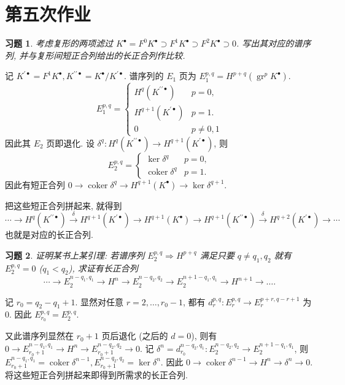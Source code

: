 \documentclass{article}
\theoremstyle{exercise}
\newtheorem{exercise}{习题}[section]
\theoremstyle{plain}
\theoremstyle{remark}
\newenvironment{proofc}{\proof}{\endproof}
\def\coker{\operatorname{coker}}
\begin{document}
\section{第五次作业}

\begin{exercise}
  考虑复形的两项滤过 $K^\bullet = F^0 K^\bullet \supset F^1 K^\bullet \supset F^2 K^\bullet \supset 0$.
  写出其对应的谱序列, 并与复形间短正合列给出的长正合列作比较.
\end{exercise}

\begin{proofc}
  记 $K^{\prime\bullet} = F^1 K^\bullet, K^{\prime\prime\bullet} = K^\bullet / K^{\prime\bullet}$.
  谱序列的 $E_1$ 页为 $E_1^{p, q} = H^{p + q}(\operatorname{gr}^p K^\bullet)$.
  \[
    E_1^{p, q} = \begin{cases}
      H^q(K^{\prime\prime\bullet}) & p = 0, \\
      H^{q + 1} (K^{\prime\bullet}) & p = 1. \\
      0 & p \neq 0, 1
    \end{cases}
  \]
  因此其 $E_2$ 页即退化. 设 $\delta^q \colon H^q(K^{\prime\prime\bullet}) \to H^{q + 1}(K^{\prime\bullet})$, 则
  \[
    E_2^{p, q} = \begin{cases}
      \ker \delta^q & p = 0,\\
      \coker \delta^q & p = 1.
    \end{cases}
  \]
  因此有短正合列 $0 \to \coker \delta^q \to H^{q + 1}(K^\bullet) \to \ker \delta^{q + 1}$.
  
  把这些短正合列拼起来, 就得到
  \[
    \cdots \to H^q(K^{\prime\prime\bullet}) \xrightarrow{\delta} H^{q + 1}(K^{\prime\bullet}) \to H^{q + 1}(K^\bullet)
    \to H^{q + 1}(K^{\prime\prime\bullet}) \xrightarrow{\delta} H^{q + 2}(K^{\prime\bullet}) \to \cdots
  \]
  也就是对应的长正合列.
\end{proofc}

\begin{exercise}
  证明某书上某引理:
  若谱序列 $E_2^{p, q} \Rightarrow H^{p + q}$ 满足只要 $q \neq q_1, q_2$ 就有 $E_2^{p, q} = 0$ ($q_1 < q_2$),
  求证有长正合列
  \[
    \cdots \to E_2^{n - q_1, q_1} \to H^n \to E_2^{n - q_2, q_2} \to E_2^{n + 1 - q_1, q_1} \to H^{n + 1} \to \dots.
  \]
\end{exercise}

\begin{proofc}
  记 $r_0 = q_2 - q_1 + 1$.
  显然对任意 $r = 2, \dots, r_0 - 1$, 都有 $d_r^{p, q} \colon E_r^{p, q} \to E_r^{p + r, q - r + 1}$ 为 $0$.
  因此 $E_{r_0}^{p, q} = E_2^{p, q}$.
  
  又此谱序列显然在 $r_0 + 1$ 页后退化 (之后的 $d = 0$), 则有
  $0 \to E_{r_0 + 1}^{n - q_1, q_1} \to H^n \to E_{r_0 + 1}^{n - q_2, q_2} \to 0$.
  记 $\delta^n = d_{r_0}^{n - q_2, q_1} \colon E_2^{n - q_2, q_2} \to E_2^{n + 1 - q_1, q_1}$,
  则 $E_{r_0 + 1}^{n - q_1, q_1} = \coker \delta^{n-1}, E_{r_0 + 1}^{n - q_2, q_2} = \ker \delta^n$.
  因此
  $0 \to \coker \delta^{n-1} \to H^n \to \delta^n \to 0$.
  将这些短正合列拼起来即得到所需求的长正合列.
\end{proofc}
\end{document}
